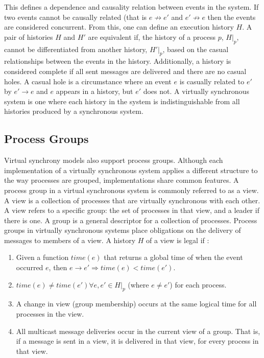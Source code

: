 This defines a dependence and causality relation between events in the system. If two events cannot be causally related (that is $e \not\rightarrow e'$ and $e' \not\rightarrow e$ then the events are considered concurrent. From this, one can define an execution history $H$. A pair of histories $H$ and $H'$ are equivalent if, the history of a process $p$, $H|_{p}$, cannot be differentiated from another history, $H'|_{p}$, based on the casual relationships between the events in the history. \cite[p~.103]{ISISTOOLKIT} Additionally, a history is considered complete if all sent messages are delivered and there are no casual holes. A casual hole is a circumstance where an event $e$ is casually related to $e'$ by $e' \rightarrow e$ and $e$ appears in a history, but $e'$ does not. A virtually synchronous system is one where each history in the system is indistinguishable from all histories produced by a synchronous system. \cite[p~.104]{ISISTOOLKIT}

\subsection{Process Groups}
Virtual synchrony models also support process groups. Although each implementation of a virtually synchronous system applies a different structure to the way processes are grouped, implementations share common features.
A process group in a virtual synchronous system is commonly referred to as a view. A view is a collection of processes that are virtually synchronous with each other. A view refers to a specific group: the set of processes in that view, and a leader if there is one. A group is a general descriptor for a collection of processes. Process groups in virtually synchronous systems place obligations on the delivery of messages to members of a view. A history $H$ of a view is legal if \cite[p~.103]{ISISTOOLKIT}:
\begin{enumerate}
    \item Given a function $time(e)$ that returns a global time of when the event occurred $e$, then $e \rightarrow e' \Rightarrow time(e) < time(e').$
    \item $time(e) \neq time(e') \forall e, e' \in H|_{p}$ (where $e \neq e'$) for each process.
    \item A change in view (group membership) occurs at the same logical time for all processes in the view.
    \item All multicast message deliveries occur in the current view of a group. That is, if a message is sent in a view, it is delivered in that view, for every process in that view.
\end{enumerate}

